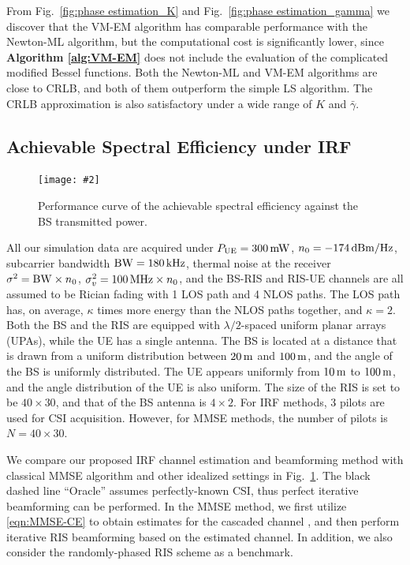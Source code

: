 \documentclass[12pt,draftclsnofoot,journal,onecolumn]{IEEEtran}
\theoremstyle{nonumberplain}
\newcommand{\myincludegraphics}[2][width=12cm]{\texttt{[image: \#2]}}
\begin{document}
    From Fig.~\ref{fig:phase estimation_K} and Fig.~\ref{fig:phase estimation_gamma} we discover that the VM-EM algorithm has comparable performance with the Newton-ML algorithm, but the computational cost is significantly lower, since {\bf Algorithm \ref{alg:VM-EM}} does not include the evaluation of the complicated modified Bessel functions. Both the Newton-ML and VM-EM algorithms are close to CRLB, and both of them outperform the simple LS algorithm. The CRLB approximation is also satisfactory under a wide range of $K$ and $\bar{\gamma}$. 

\subsection{Achievable Spectral Efficiency under IRF}
    \begin{figure}[!t]
        \centering
        \myincludegraphics{data/rate.pdf}
        \caption{Performance curve of the achievable spectral efficiency against the BS transmitted power.}
        \label{fig:rate}
    \end{figure}
    All our simulation data are acquired under $P_{\rm UE}=300 \,{\rm mW}$, $n_0=-174\,{\rm dBm/Hz}$, subcarrier bandwidth ${\rm BW} = 180\,{\rm kHz}$, thermal noise at the receiver $\sigma^2 = {\rm BW}\times n_0$, $\sigma_v^2=100\,{\rm MHz}\times n_0$, and the BS-RIS and RIS-UE channels are all assumed to be Rician fading with 1 LOS path and 4 NLOS paths. The LOS path has, on average, $\kappa$ times more energy than the NLOS paths together, and $\kappa=2$. Both the BS and the RIS are equipped with $\lambda/2$-spaced uniform planar arrays (UPAs), while the UE has a single antenna. The BS is located at a distance that is drawn from a uniform distribution between $20\,{\rm m}$ and $100\,{\rm m}$, and the angle of the BS is uniformly distributed. The UE appears uniformly from $10\,{\rm m}$ to $100\,{\rm m}$, and the angle distribution of the UE is also uniform. The size of the RIS is set to be $40\times 30$, and that of the BS antenna is $4\times 2$. For IRF methods, 3 pilots are used for CSI acquisition. However, for MMSE methods, the number of pilots is $N=40\times 30$. 

    We compare our proposed \ac{IRF} channel estimation and beamforming method with classical MMSE algorithm and other idealized settings in Fig.~\ref{fig:rate}. The black dashed line ``Oracle'' assumes perfectly-known CSI, thus perfect iterative beamforming can be performed. In the MMSE method, we first utilize \eqref{eqn:MMSE-CE} to obtain estimates for the cascaded channel \cite{wei2021channel}, and then perform iterative RIS beamforming based on the estimated channel. In addition, we also consider the randomly-phased RIS scheme as a benchmark.  
\end{document}
